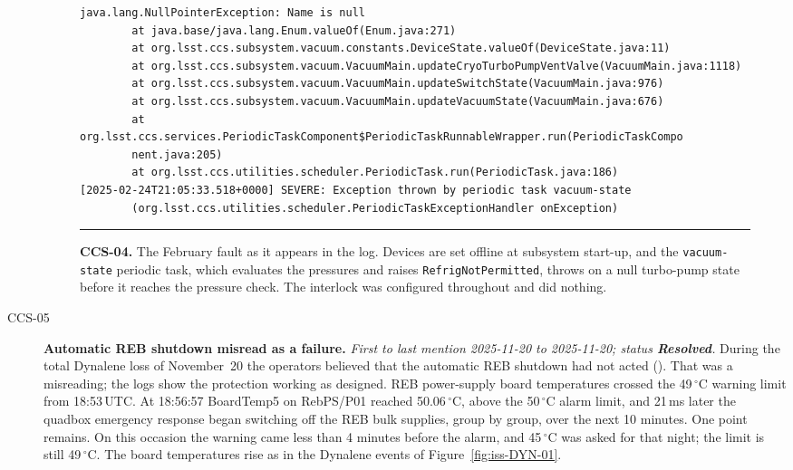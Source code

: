 \begin{description}
\begin{figure}[H]
\begin{minipage}{\textwidth}
\begin{verbatim}
java.lang.NullPointerException: Name is null
        at java.base/java.lang.Enum.valueOf(Enum.java:271)
        at org.lsst.ccs.subsystem.vacuum.constants.DeviceState.valueOf(DeviceState.java:11)
        at org.lsst.ccs.subsystem.vacuum.VacuumMain.updateCryoTurboPumpVentValve(VacuumMain.java:1118)
        at org.lsst.ccs.subsystem.vacuum.VacuumMain.updateSwitchState(VacuumMain.java:976)
        at org.lsst.ccs.subsystem.vacuum.VacuumMain.updateVacuumState(VacuumMain.java:676)
        at org.lsst.ccs.services.PeriodicTaskComponent$PeriodicTaskRunnableWrapper.run(PeriodicTaskCompo
        nent.java:205)
        at org.lsst.ccs.utilities.scheduler.PeriodicTask.run(PeriodicTask.java:186)
[2025-02-24T21:05:33.518+0000] SEVERE: Exception thrown by periodic task vacuum-state
        (org.lsst.ccs.utilities.scheduler.PeriodicTaskExceptionHandler onException)
\end{verbatim}
\endgroup
\vspace{-10pt}\hrule
\end{minipage}
\caption{\textbf{CCS-04.} The February fault as it appears in the log.  Devices are set offline at subsystem start-up, and the \texttt{vacuum-state} periodic task, which evaluates the pressures and raises \texttt{RefrigNotPermitted}, throws on a null turbo-pump state before it reaches the pressure check.  The interlock was configured throughout and did nothing.}
\label{fig:iss-CCS-04}
\end{figure}

\item[CCS-05]\label{iss:CCS-05} \textbf{Automatic REB shutdown misread as a failure.}
  \emph{First to last mention 2025-11-20 to 2025-11-20; status \textcolor{stres}{\textbf{Resolved}}.}
  During the total Dynalene loss of November~20 the operators believed that the automatic REB shutdown had not acted ().  That was a misreading; the logs show the protection working as designed.  REB power-supply board temperatures crossed the 49\,$^{\circ}$C warning limit from 18:53\,UTC.  At 18:56:57 BoardTemp5 on RebPS/P01 reached 50.06\,$^{\circ}$C, above the 50\,$^{\circ}$C alarm limit, and 21\,ms later the quadbox emergency response began switching off the REB bulk supplies, group by group, over the next 10 minutes.  One point remains.  On this occasion the warning came less than 4 minutes before the alarm, and 45\,$^{\circ}$C was asked for that night; the limit is still 49\,$^{\circ}$C.  The board temperatures rise as in the Dynalene events of Figure~\ref{fig:iss-DYN-01}.


\end{description}
